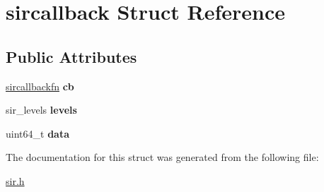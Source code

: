 \hypertarget{structsircallback}{}\section{sircallback Struct Reference}
\label{structsircallback}
\subsection*{Public Attributes}
\begin{DoxyCompactItemize}
\item 
\hyperlink{sir_8h_ace3ea4091f07fc8e8cde5b1c14b3fd29}{sircallbackfn} {\bfseries cb}\hypertarget{structsircallback_a3ef42608fdde48df814d21a10b8db417}{}\label{structsircallback_a3ef42608fdde48df814d21a10b8db417}

\item 
sir\+\_\+levels {\bfseries levels}\hypertarget{structsircallback_afe26255fbc47f4337fe51d877d8de82e}{}\label{structsircallback_afe26255fbc47f4337fe51d877d8de82e}

\item 
uint64\+\_\+t {\bfseries data}\hypertarget{structsircallback_a58c143d45ba4a6a38d3e82bdc0fb16ce}{}\label{structsircallback_a58c143d45ba4a6a38d3e82bdc0fb16ce}

\end{DoxyCompactItemize}


The documentation for this struct was generated from the following file\+:\begin{DoxyCompactItemize}
\item 
\hyperlink{sir_8h}{sir.\+h}\end{DoxyCompactItemize}
